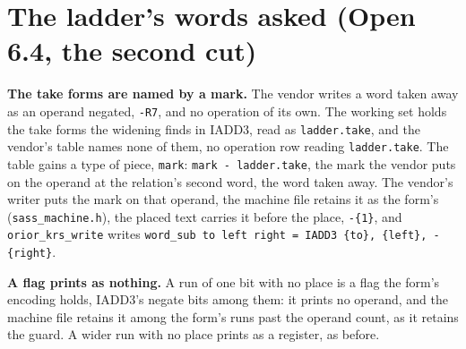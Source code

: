 \section{\texorpdfstring{The ladder's words asked (Open 6.4, the second cut)}{The ladder's words asked (Open 6.4, the second cut)}}

\textbf{The take forms are named by a mark.} The vendor writes a word taken away as an operand negated, \texttt{-\allowbreak{}R7}, and no operation of its own. The working set holds the take forms the widening finds in IADD3, read as \texttt{ladder.\allowbreak{}take}, and the vendor's table names none of them, no operation row reading \texttt{ladder.\allowbreak{}take}. The table gains a type of piece, \texttt{mark}: \texttt{mark -\allowbreak{} ladder.\allowbreak{}take}, the mark the vendor puts on the operand at the relation's second word, the word taken away. The vendor's writer puts the mark on that operand, the machine file retains it as the form's (\texttt{sass\_\allowbreak{}machine.\allowbreak{}h}), the placed text carries it before the place, \texttt{-\allowbreak{}\{1\}}, and \texttt{orior\_\allowbreak{}krs\_\allowbreak{}write} writes \texttt{word\_\allowbreak{}sub to left right = IADD3 \{to\}, \{left\}, -\allowbreak{}\{right\}}.

\textbf{A flag prints as nothing.} A run of one bit with no place is a flag the form's encoding holds, IADD3's negate bits among them: it prints no operand, and the machine file retains it among the form's runs past the operand count, as it retains the guard. A wider run with no place prints as a register, as before.

